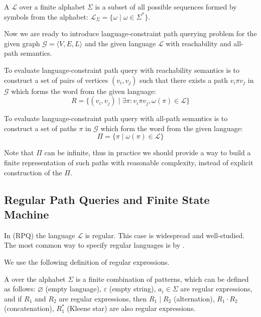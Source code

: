 \begin{definition}
A  $\mathcal{L}$ over a finite alphabet $\Sigma$ is a subset of all possible sequences formed by symbols from the alphabet: $\mathcal{L}_{\Sigma} = \{\omega \mid \omega \in \Sigma^*\}$.
\end{definition}

Now we are ready to introduce language-constraint path querying problem for the given graph  $\mathcal{G} = \langle V,E,L \rangle$ and the given language $\mathcal{L}$ with reachability and all-path semantics.

\begin{definition}
To evaluate language-constraint path query with reachability semantics is to construct a set of pairs of vertices $(v_i,v_j)$ such that there exists a path $v_i \pi v_j$ in $\mathcal{G}$ which forms the word from the given language:
$$
R = \{(v_i,v_j) \mid \exists \pi: v_i \pi v_j, \omega(\pi) \in \mathcal{L} \}
$$
\end{definition}

\begin{definition}
To evaluate language-constraint path query with all-path semantics is to construct a set of paths $\pi$ in $\mathcal{G}$ which form the word from the given language:
$$
\Pi = \{ \pi \mid \omega(\pi) \in \mathcal{L}\}
$$
\end{definition}

Note that $\Pi$ can be infinite, thus in practice we should provide a way to build a finite representation of such paths with reasonable complexity, instead of explicit construction of the $\Pi$.

\subsection{Regular Path Queries and Finite State Machine}

In  (RPQ) the language $\mathcal{L}$ is regular.
This case is widespread and well-studied.
The most common way to specify regular languages is by .

We use the following definition of regular expressions.
\begin{definition}
A  over the alphabet $\Sigma$ is a finite combination of patterns, which can be defined as follows: $\varnothing$ (empty language), $\varepsilon$ (empty string), $a_i \in \Sigma$ are regular expressions, and if $R_1$ and $R_2$ are regular expressions, then $R_1 \mid R_2$ (alternation), $R_1 \cdot R_2$ (concatenation), $R_1^*$ (Kleene star) are also regular expressions.
\end{definition} 

